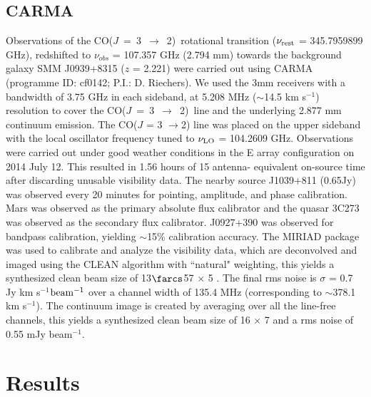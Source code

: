 \documentclass[twocolumn,apj,numberedappendix]{emulateapj}
\newcommand{\rarr}{$\rightarrow$}
\newcommand{\CO}{\mbox{CO($J$ = 3 $\rightarrow$ 2) }}
\newcommand{\pmOne}{$^{-1}$}
\begin{document}
\subsection{CARMA} \label{sec:carmadata}
Observations of the \CO rotational transition ($\nu_{\rm rest}$ = 345.7959899 GHz),
redshifted to $\nu_{obs}$ = 107.357 GHz (2.794 mm) towards the background galaxy SMM
J0939+8315 ($z$ = 2.221) were carried out using CARMA (programme ID: cf0142; P.I.: D. Riechers).
We used the 3mm receivers with a bandwidth of 3.75 GHz in each sideband, at 5.208 MHz ($\sim$14.5 km s\pmOne)
resolution to cover the \CO line and the underlying 2.877 mm continuum emission. The CO($J$ = 3 
\rarr 2) line was placed on the
upper sideband with the local oscillator frequency tuned to $\nu_{\rm LO}$ = 104.2609 GHz.
Observations were carried out under good
weather conditions in the E array configuration on 2014 July 12. This resulted in 1.56 hours of 15 antenna-
equivalent on-source time after discarding unusable visibility data.
The nearby source J1039+811 (0.65Jy) was observed every 20 minutes for
pointing, amplitude, and phase calibration. Mars was observed as the primary
absolute flux calibrator and the quasar 3C273 was observed as the secondary
flux calibrator. J0927+390 was observed for bandpass calibration, yielding $\sim
$15\% calibration accuracy.
The {\sc MIRIAD} package was used to calibrate and analyze the visibility data, which are deconvolved and imaged using
the CLEAN algorithm with ``natural" weighting, this yields a synthesized clean beam size of 13$\farcs$57 $\times$ 
5 . The final rms noise is $\sigma$ = 0.7 Jy km s\pmOne $\rm beam^{-1}$ over
a channel width of 135.4 MHz (corresponding to $\sim$378.1 km s\pmOne). The continuum image is created by
averaging over all the line-free channels, this yields a synthesized clean beam size of 16 $\times$ 7 and a 
rms noise of 0.55 mJy beam\pmOne.

\section{Results}\label{sec:res}
\end{document}
